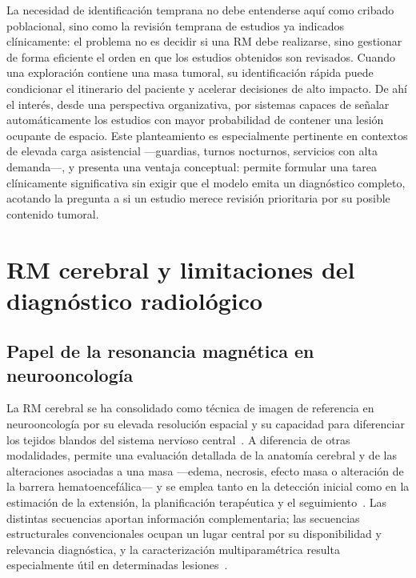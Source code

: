 La necesidad de identificación temprana no debe entenderse aquí como cribado
poblacional, sino como la revisión temprana de estudios ya indicados clínicamente: el problema
no es decidir si una RM debe realizarse, sino gestionar de forma eficiente el
orden en que los estudios obtenidos son revisados. Cuando una exploración
contiene una masa tumoral, su identificación rápida puede condicionar el
itinerario del paciente y acelerar decisiones de alto impacto. De ahí el interés,
desde una perspectiva organizativa, por sistemas capaces de señalar
automáticamente los estudios con mayor probabilidad de contener una lesión
ocupante de espacio. Este planteamiento es especialmente pertinente en contextos
de elevada carga asistencial ---guardias, turnos nocturnos, servicios con alta
demanda---, y presenta una ventaja conceptual: permite formular una tarea
clínicamente significativa sin exigir que el modelo emita un diagnóstico completo,
acotando la pregunta a si un estudio merece revisión prioritaria por su posible
contenido tumoral.

\section{RM cerebral y limitaciones del diagnóstico radiológico}

\subsection{Papel de la resonancia magnética en neurooncología}

La RM cerebral se ha consolidado como técnica de imagen de referencia en
neurooncología por su elevada resolución espacial y su capacidad para diferenciar
los tejidos blandos del sistema nervioso central~\cite{villanuevameyer2017imaging}.
A diferencia de otras modalidades, permite una evaluación detallada de la anatomía
cerebral y de las alteraciones asociadas a una masa ---edema, necrosis, efecto
masa o alteración de la barrera hematoencefálica--- y se emplea tanto en la
detección inicial como en la estimación de la extensión, la planificación
terapéutica y el seguimiento~\cite{martucci2023mri}. Las distintas secuencias
aportan información complementaria; las secuencias estructurales convencionales
ocupan un lugar central por su disponibilidad y relevancia diagnóstica, y la
caracterización multiparamétrica resulta especialmente útil en determinadas
lesiones~\cite{laukamp2021meningioma}.

